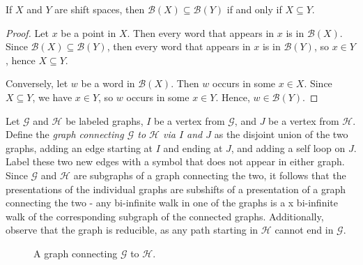\documentclass{article}
\newcommand{\Gc}{\mathcal{G}}  %
\newcommand{\Hc}{\mathcal{H}}  %
\newcommand{\Bc}{\mathcal{B}}
\newcommand{\term}[1]{\textit{#1}}
\theoremstyle{definition}
\begin{document}
    \begin{lemma}
        If \(X\) and \(Y\) are shift spaces, then \(\Bc(X) \subseteq \Bc(Y)\) if and only if \(X \subseteq Y\).
    \end{lemma}

    \begin{proof}
        Let \(x\) be a point in \(X\). Then every word that appears in \(x\) is in \(\Bc(X)\). Since 
        \(\Bc(X) \subseteq \Bc(Y)\), then every word that appears in \(x\) is in \(\Bc(Y)\),
        so \(x \in Y\), hence \(X \subseteq Y\).

        Conversely, let \(w\) be a word in \(\Bc(X)\). Then \(w\) occurs in some \(x \in X\). 
        Since \(X \subseteq Y\), we have \(x \in Y\), so \(w\) occurs in some \(x \in Y\). Hence, \(w \in \Bc(Y)\).
    \end{proof}

    Let \(\Gc\) and \(\Hc\) be labeled graphs, \(I\) be a vertex from \(\Gc\), and \(J\) 
    be a vertex from \(\Hc\). Define the \term{graph connecting \(\Gc\) to \(\Hc\) via \(I\) and \(J\)} 
    as the disjoint union of the two graphs, adding an edge starting at \(I\) and ending at \(J\), 
    and adding a self loop on \(J\). Label these two new edges with a symbol that 
    does not appear in either graph. 
    Since \(\Gc\) and \(\Hc\) are subgraphs of a graph connecting the two,
    it follows that the presentations of the individual graphs are subshifts of a presentation 
    of a graph connecting the two - any bi-infinite walk in one of the graphs is a x
    bi-infinite walk of the corresponding subgraph of the connected graphs.
    Additionally, observe that the graph is reducible,
    as any path starting in \(\Hc\) cannot end in \(\Gc\).
    

    \begin{figure}[ht]
        \centering

        \caption{A graph connecting \(\Gc\) to \(\Hc\).}
    \end{figure}
\end{document}
